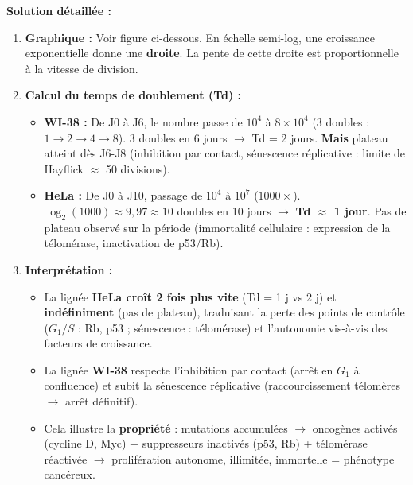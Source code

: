 \documentclass[11pt]{article}
\begin{document}
\begin{exoresolu}
\textbf{Solution détaillée :}
\begin{enumerate}
    \item \textbf{Graphique :} Voir figure ci-dessous. En échelle semi-log, une croissance exponentielle donne une \textbf{droite}. La pente de cette droite est proportionnelle à la vitesse de division.
    \item \textbf{Calcul du temps de doublement (Td) :}
        \begin{itemize}
            \item \textbf{WI-38 :} De J0 à J6, le nombre passe de $10^4$ à $8 \times 10^4$ (3 doubles : $1 \to 2 \to 4 \to 8$). 3 doubles en 6 jours $\rightarrow$ Td = 2 jours. \textbf{Mais} plateau atteint dès J6-J8 (inhibition par contact, sénescence réplicative : limite de Hayflick $\approx$ 50 divisions).
            \item \textbf{HeLa :} De J0 à J10, passage de $10^4$ à $10^7$ ($1000 \times$). $\log_2(1000) \approx 9,97 \approx 10$ doubles en 10 jours $\rightarrow$ \textbf{Td $\approx$ 1 jour}. Pas de plateau observé sur la période (immortalité cellulaire : expression de la télomérase, inactivation de p53/Rb).
        \end{itemize}
    \item \textbf{Interprétation :}
        \begin{itemize}
            \item La lignée \textbf{HeLa croît 2 fois plus vite} (Td = 1 j vs 2 j) et \textbf{indéfiniment} (pas de plateau), traduisant la perte des points de contrôle ($G_1/S$ : Rb, p53 ; sénescence : télomérase) et l'autonomie vis-à-vis des facteurs de croissance.
            \item La lignée \textbf{WI-38} respecte l'inhibition par contact (arrêt en $G_1$ à confluence) et subit la sénescence réplicative (raccourcissement télomères $\rightarrow$ arrêt définitif).
            \item Cela illustre la \textbf{propriété} : mutations accumulées $\rightarrow$ oncogènes activés (cycline D, Myc) + suppresseurs inactivés (p53, Rb) + télomérase réactivée $\rightarrow$ prolifération autonome, illimitée, immortelle = phénotype cancéreux.
        \end{itemize}
\end{enumerate}
\end{exoresolu}
\end{document}
